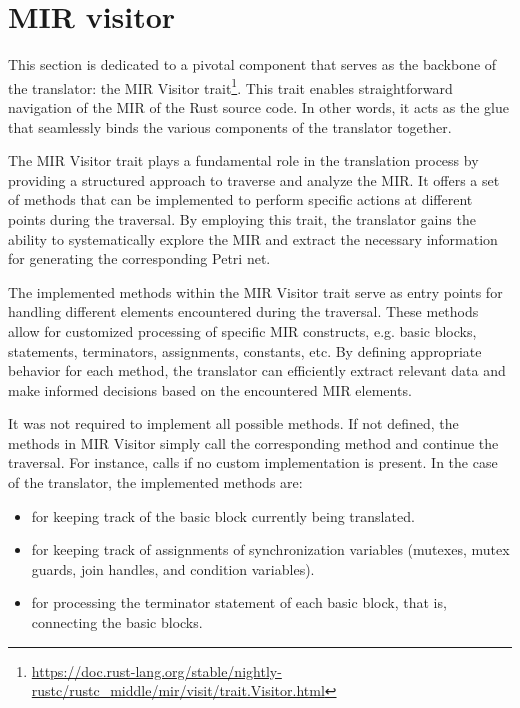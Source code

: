 \section{MIR visitor}

This section is dedicated to a pivotal component that serves as the backbone of the translator:
the MIR Visitor trait\footnote{\url{https://doc.rust-lang.org/stable/nightly-rustc/rustc_middle/mir/visit/trait.Visitor.html}}.
This trait enables straightforward navigation of the \acrshort{MIR} of the Rust source code.
In other words, it acts as the glue that seamlessly binds the various components of the translator together.

The MIR Visitor trait plays a fundamental role in the translation process
by providing a structured approach to traverse and analyze the \acrshort{MIR}.
It offers a set of methods that can be implemented to perform specific actions
at different points during the traversal.
By employing this trait,
the translator gains the ability to systematically explore the \acrshort{MIR}
and extract the necessary information for generating the corresponding Petri net.

The implemented methods within the MIR Visitor trait serve
as entry points for handling different elements encountered during the traversal.
These methods allow for customized processing of specific \acrshort{MIR} constructs,
e.g. basic blocks, statements, terminators, assignments, constants, etc.
By defining appropriate behavior for each method,
the translator can efficiently extract relevant data and
make informed decisions based on the encountered MIR elements.

It was not required to implement all possible methods.
If not defined, the methods in MIR Visitor simply call
the corresponding  method and continue the traversal.
For instance,  calls
 if no custom implementation is present.
In the case of the translator, the implemented methods are:

\begin{itemize}
  \item {} for keeping track of the basic block currently being translated.
  \item {} for keeping track of assignments of synchronization variables
        (mutexes, mutex guards, join handles, and condition variables).
  \item {} for processing the terminator statement of each basic block,
        that is, connecting the basic blocks.
\end{itemize}

